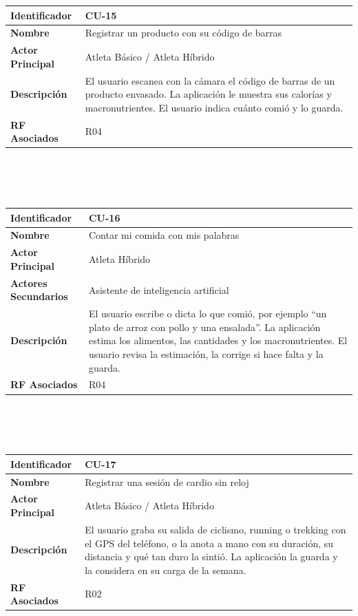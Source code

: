 \newpage
\begin{tabular}{|p{3.5cm}|p{11.5cm}|}
    \hline
    \rowcolor[HTML]{EFEFEF}
    \textbf{Identificador} & \textbf{CU-15} \\ \hline
    \textbf{Nombre} & Registrar un producto con su código de barras \\ \hline
    \textbf{Actor Principal} & Atleta Básico / Atleta Híbrido \\ \hline
    \textbf{Descripción} & El usuario escanea con la cámara el código de barras de un producto envasado. La aplicación le muestra sus calorías y macronutrientes. El usuario indica cuánto comió y lo guarda. \\ \hline
    \textbf{RF Asociados} & R04 \\ \hline
\end{tabular}
\\\\\\
\begin{tabular}{|p{3.5cm}|p{11.5cm}|}
    \hline
    \rowcolor[HTML]{EFEFEF}
    \textbf{Identificador} & \textbf{CU-16} \\ \hline
    \textbf{Nombre} & Contar mi comida con mis palabras \\ \hline
    \textbf{Actor Principal} & Atleta Híbrido \\ \hline
    \textbf{Actores Secundarios} & Asistente de inteligencia artificial \\ \hline
    \textbf{Descripción} & El usuario escribe o dicta lo que comió, por ejemplo ``un plato de arroz con pollo y una ensalada''. La aplicación estima los alimentos, las cantidades y los macronutrientes. El usuario revisa la estimación, la corrige si hace falta y la guarda. \\ \hline
    \textbf{RF Asociados} & R04 \\ \hline
\end{tabular}
\\\\\\
\begin{tabular}{|p{3.5cm}|p{11.5cm}|}
    \hline
    \rowcolor[HTML]{EFEFEF}
    \textbf{Identificador} & \textbf{CU-17} \\ \hline
    \textbf{Nombre} & Registrar una sesión de cardio sin reloj \\ \hline
    \textbf{Actor Principal} & Atleta Básico / Atleta Híbrido \\ \hline
    \textbf{Descripción} & El usuario graba su salida de ciclismo, running o trekking con el GPS del teléfono, o la anota a mano con su duración, su distancia y qué tan duro la sintió. La aplicación la guarda y la considera en su carga de la semana. \\ \hline
    \textbf{RF Asociados} & R02 \\ \hline
\end{tabular}
